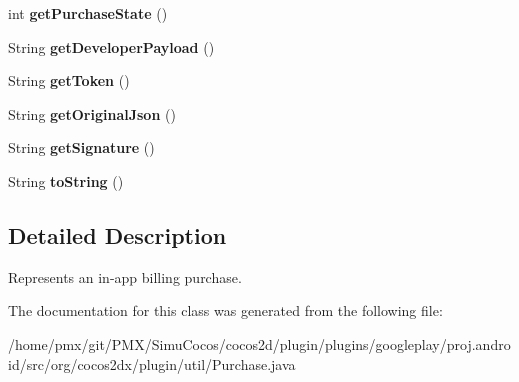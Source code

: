 \begin{DoxyCompactItemize}
int {\bfseries get\+Purchase\+State} ()
\item 
\mbox{\label{classorg_1_1cocos2dx_1_1plugin_1_1util_1_1Purchase_ae9eb142ab9fa586f10325ef0e03b49a5}} 
String {\bfseries get\+Developer\+Payload} ()
\item 
\mbox{\label{classorg_1_1cocos2dx_1_1plugin_1_1util_1_1Purchase_aaf096c1cdaac04ff806c382349596937}} 
String {\bfseries get\+Token} ()
\item 
\mbox{\label{classorg_1_1cocos2dx_1_1plugin_1_1util_1_1Purchase_a50207b0207501dc71cef8399758483a7}} 
String {\bfseries get\+Original\+Json} ()
\item 
\mbox{\label{classorg_1_1cocos2dx_1_1plugin_1_1util_1_1Purchase_a6709d3b6a255c1468c38c1fbb519185f}} 
String {\bfseries get\+Signature} ()
\item 
\mbox{\label{classorg_1_1cocos2dx_1_1plugin_1_1util_1_1Purchase_ab65c89a02ffcd1a46aa68c4104d26ac7}} 
String {\bfseries to\+String} ()
\end{DoxyCompactItemize}


\subsection{Detailed Description}
Represents an in-\/app billing purchase. 

The documentation for this class was generated from the following file\+:\begin{DoxyCompactItemize}
\item 
/home/pmx/git/\+P\+M\+X/\+Simu\+Cocos/cocos2d/plugin/plugins/googleplay/proj.\+android/src/org/cocos2dx/plugin/util/Purchase.\+java\end{DoxyCompactItemize}
